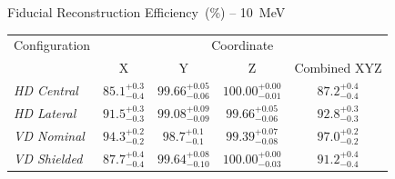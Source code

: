 \centering
Fiducial Reconstruction Efficiency~(\%) -- \SI{10}{\mega\electronvolt}\\
\begin{tabular}{lcccc}
\toprule
Configuration & \multicolumn{4}{c}{Coordinate} \\
 & X & Y & Z & Combined XYZ \\
\midrule
\emph{HD Central} & $85.1^{+0.3}_{-0.4}$ & $99.66^{+0.05}_{-0.06}$ & $100.00^{+0.00}_{-0.01}$ & $87.2^{+0.4}_{-0.4}$ \\
\emph{HD Lateral} & $91.5^{+0.3}_{-0.3}$ & $99.08^{+0.09}_{-0.09}$ & $99.66^{+0.05}_{-0.06}$ & $92.8^{+0.3}_{-0.3}$ \\
\emph{VD Nominal} & $94.3^{+0.2}_{-0.2}$ & $98.7^{+0.1}_{-0.1}$ & $99.39^{+0.07}_{-0.08}$ & $97.0^{+0.2}_{-0.2}$ \\
\emph{VD Shielded} & $87.7^{+0.4}_{-0.4}$ & $99.64^{+0.08}_{-0.10}$ & $100.00^{+0.00}_{-0.03}$ & $91.2^{+0.4}_{-0.4}$ \\
\bottomrule
\end{tabular}
